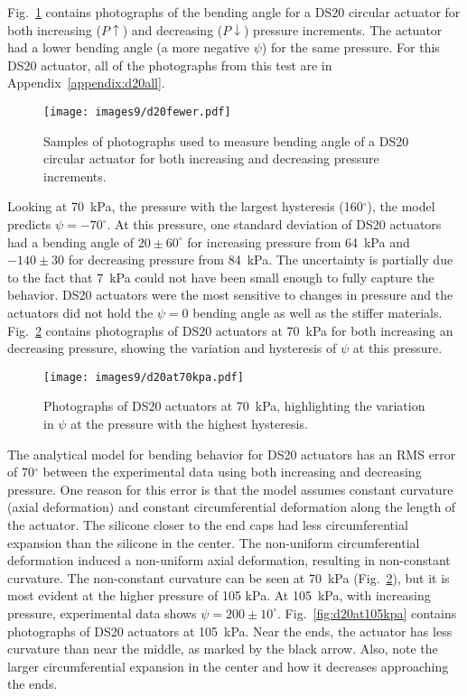 Fig.~\ref{fig:d20fewer} contains photographs of the bending angle for a DS20 circular actuator for both increasing ($P\uparrow$) and decreasing ($P\downarrow$) pressure increments. The actuator had a lower bending angle (a more negative $\psi$) for the same pressure. For this DS20 actuator, all of the photographs from this test are in Appendix~\ref{appendix:d20all}.

\begin{figure}[!ht]
    \centering
    \texttt{[image: images9/d20fewer.pdf]}
    \caption{Samples of photographs used to measure bending angle of a DS20 circular actuator for both increasing and decreasing pressure increments.}
    \label{fig:d20fewer}
\end{figure}

\clearpage
Looking at 70~kPa, the pressure with the largest hysteresis (160$^\circ$), the model predicts $\psi=-70^\circ$. At this pressure, one standard deviation of DS20 actuators had a bending angle of $20\pm60^\circ$ for increasing pressure from 64~kPa and $-140\pm30$ for decreasing pressure from 84~kPa. The uncertainty is partially due to the fact that 7~kPa could not have been small enough to fully capture the behavior. DS20 actuators were the most sensitive to changes in pressure and the actuators did not hold the $\psi=0$ bending angle as well as the stiffer materials. Fig.~\ref{fig:d20at70kpa} contains photographs of DS20 actuators at 70~kPa for both increasing an decreasing pressure, showing the variation and hysteresis of $\psi$ at this pressure.

\begin{figure}[!ht]
    \centering
     \texttt{[image: images9/d20at70kpa.pdf]}
    \caption{Photographs of DS20 actuators at 70~kPa, highlighting the variation in $\psi$ at the pressure with the highest hysteresis. }
    \label{fig:d20at70kpa}
\end{figure}

The analytical model for bending behavior for DS20 actuators has an RMS error of 70$^\circ$ between the experimental data using both increasing and decreasing pressure. One reason for this error is that the model assumes constant curvature (axial deformation) and constant circumferential deformation along the length of the actuator. The silicone closer to the end caps had less circumferential expansion than the silicone in the center. The non-uniform circumferential deformation induced a non-uniform axial deformation, resulting in non-constant curvature. The non-constant curvature can be seen at 70~kPa (Fig.~\ref{fig:d20at70kpa}), but it is most evident at the higher pressure of 105 kPa. At 105~kPa, with increasing pressure, experimental data shows $\psi=200\pm10^\circ$. Fig.~\ref{fig:d20at105kpa} contains photographs of DS20 actuators at 105~kPa. Near the ends, the actuator has less curvature than near the middle, as marked by the black arrow. Also, note the larger circumferential expansion in the center and how it decreases approaching the ends. 

